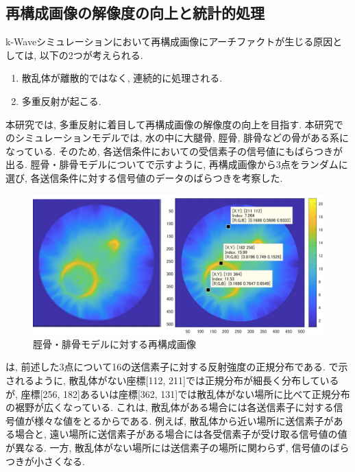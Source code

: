 \subsection{再構成画像の解像度の向上と統計的処理}
k-Waveシミュレーションにおいて再構成画像にアーチファクトが生じる原因としては, 以下の2つが考えられる. 
\begin{enumerate}
\item 散乱体が離散的ではなく, 連続的に処理される. 
\item 多重反射が起こる.  
\end{enumerate}
本研究では, 多重反射に着目して再構成画像の解像度の向上を目指す. 本研究でのシミュレーションモデルでは, 水の中に大腿骨, 脛骨, 腓骨などの骨がある系になっている. そのため, 各送信条件においての受信素子の信号値にもばらつきが出る. 脛骨・腓骨モデルについてで示すように, 再構成画像から3点をランダムに選び, 各送信条件に対する信号値のデータのばらつきを考察した.
\begin{figure}[H]
  \begin{center}
    \includegraphics[width=140mm]{fig/hikotsusaikousei.pdf}
  \end{center}
  \caption{脛骨・腓骨モデルに対する再構成画像}
\end{figure}
は, 前述した3点について16の送信素子に対する反射強度の正規分布である. で示されるように, 散乱体がない座標[112, 211]では正規分布が細長く分布しているが, 座標[256, 182]あるいは座標[362, 131]では散乱体がない場所に比べて正規分布の裾野が広くなっている. これは, 散乱体がある場合には各送信素子に対する信号値が様々な値をとるからである. 例えば, 散乱体から近い場所に送信素子がある場合と, 遠い場所に送信素子がある場合には各受信素子が受け取る信号値の値が異なる. 一方, 散乱体がない場所には送信素子の場所に関わらず, 信号値のばらつきが小さくなる. 
